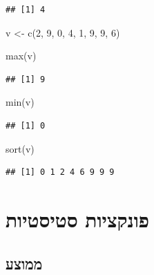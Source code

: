 \documentclass[
]{book}
\newenvironment{Shaded}{\begin{snugshade}}{\end{snugshade}}
\newcommand{\DecValTok}[1]{\textcolor[rgb]{0.00,0.00,0.81}{#1}}
\newcommand{\FunctionTok}[1]{\textcolor[rgb]{0.00,0.00,0.00}{#1}}
\newcommand{\NormalTok}[1]{#1}
\newcommand{\OtherTok}[1]{\textcolor[rgb]{0.56,0.35,0.01}{#1}}
\begin{document}
\begin{verbatim}
## [1] 4
\end{verbatim}

\begin{Shaded}
\begin{Highlighting}[]
\NormalTok{v }\OtherTok{\textless{}{-}} \FunctionTok{c}\NormalTok{(}\DecValTok{2}\NormalTok{, }\DecValTok{9}\NormalTok{, }\DecValTok{0}\NormalTok{, }\DecValTok{4}\NormalTok{, }\DecValTok{1}\NormalTok{, }\DecValTok{9}\NormalTok{, }\DecValTok{9}\NormalTok{, }\DecValTok{6}\NormalTok{)}
\end{Highlighting}
\end{Shaded}

\begin{Shaded}
\begin{Highlighting}[]
\FunctionTok{max}\NormalTok{(v)}
\end{Highlighting}
\end{Shaded}

\begin{verbatim}
## [1] 9
\end{verbatim}

\begin{Shaded}
\begin{Highlighting}[]
\FunctionTok{min}\NormalTok{(v)}
\end{Highlighting}
\end{Shaded}

\begin{verbatim}
## [1] 0
\end{verbatim}

\begin{Shaded}
\begin{Highlighting}[]
\FunctionTok{sort}\NormalTok{(v)}
\end{Highlighting}
\end{Shaded}

\begin{verbatim}
## [1] 0 1 2 4 6 9 9 9
\end{verbatim}

\hypertarget{ux5e4ux5d5ux5e0ux5e7ux5e6ux5d9ux5d5ux5ea-ux5e1ux5d8ux5d9ux5e1ux5d8ux5d9ux5d5ux5ea}{%
\section{פונקציות סטיסטיות}\label{ux5e4ux5d5ux5e0ux5e7ux5e6ux5d9ux5d5ux5ea-ux5e1ux5d8ux5d9ux5e1ux5d8ux5d9ux5d5ux5ea}}

\hypertarget{ux5deux5deux5d5ux5e6ux5e2}{%
\subsection{ממוצע}\label{ux5deux5deux5d5ux5e6ux5e2}}
\end{document}
